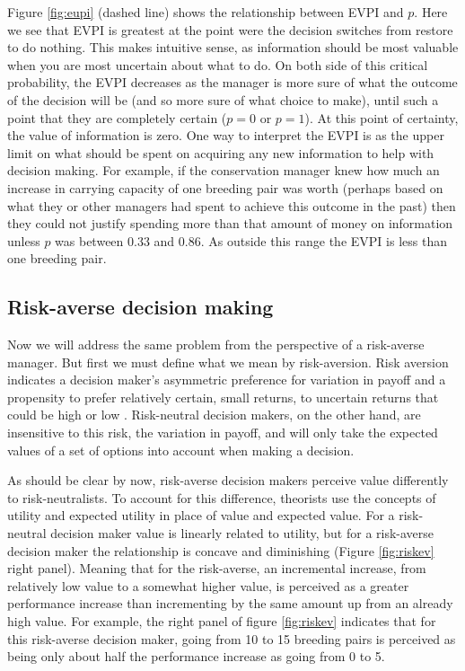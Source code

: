 \documentclass[]{article}
\theoremstyle{definition}
\theoremstyle{definition}
\theoremstyle{definition}
\theoremstyle{remark}
\begin{document}
Figure \ref{fig:eupi} (dashed line) shows the relationship between EVPI
and \(p\). Here we see that EVPI is greatest at the point were the
decision switches from restore to do nothing. This makes intuitive
sense, as information should be most valuable when you are most
uncertain about what to do. On both side of this critical probability,
the EVPI decreases as the manager is more sure of what the outcome of
the decision will be (and so more sure of what choice to make), until
such a point that they are completely certain (\(p = 0\) or \(p = 1\)).
At this point of certainty, the value of information is zero. One way to
interpret the EVPI is as the upper limit on what should be spent on
acquiring any new information to help with decision making. For example,
if the conservation manager knew how much an increase in carrying
capacity of one breeding pair was worth (perhaps based on what they or
other managers had spent to achieve this outcome in the past) then they
could not justify spending more than that amount of money on information
unless \(p\) was between 0.33 and 0.86. As outside this range the EVPI
is less than one breeding pair.

\subsection*{Risk-averse decision
making}\label{risk-averse-decision-making}

Now we will address the same problem from the perspective of a
risk-averse manager. But first we must define what we mean by
risk-aversion. Risk aversion indicates a decision maker's asymmetric
preference for variation in payoff and a propensity to prefer relatively
certain, small returns, to uncertain returns that could be high or low
\citep{Burgman2005}. Risk-neutral decision makers, on the other hand,
are insensitive to this risk, the variation in payoff, and will only
take the expected values of a set of options into account when making a
decision.

As should be clear by now, risk-averse decision makers perceive value
differently to risk-neutralists. To account for this difference,
theorists use the concepts of utility and expected utility in place of
value and expected value. For a risk-neutral decision maker value is
linearly related to utility, but for a risk-averse decision maker the
relationship is concave and diminishing (Figure \ref{fig:riskev} right
panel). Meaning that for the risk-averse, an incremental increase, from
relatively low value to a somewhat higher value, is perceived as a
greater performance increase than incrementing by the same amount up
from an already high value. For example, the right panel of figure
\ref{fig:riskev} indicates that for this risk-averse decision maker,
going from 10 to 15 breeding pairs is perceived as being only about half
the performance increase as going from 0 to 5.
\end{document}
